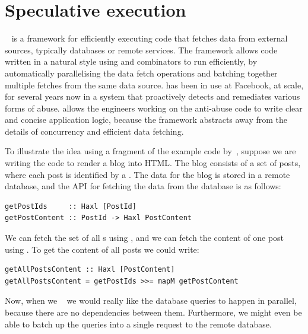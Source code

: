 \section{Speculative execution}\label{sec-haxl}

\Haxl~\citep{marlow2014haxl} is a framework for efficiently executing
code that fetches data from external sources, typically databases or
remote services. The \Haxl framework allows code written in a natural
style using  and  combinators to run
efficiently, by automatically parallelising the data fetch operations
and batching together multiple fetches from the same data source.
\Haxl has been in use at Facebook, at scale, for several years now in
a system that proactively detects and remediates various forms of
abuse. \Haxl allows the engineers working on the anti-abuse code to
write clear and concise application logic, because the framework
abstracts away from the details of concurrency and efficient data fetching.

To illustrate the idea using a fragment of the example code
by~\citet{marlow2014haxl}, suppose we are writing the code to render a blog
into HTML. The blog consists of a set of posts, where each post is identified by
a . The data for the blog is stored in a remote database, and the API
for fetching the data from the database is as follows:

\vspace{1mm}
\begin{verbatim}
getPostIds     :: Haxl [PostId]
getPostContent :: PostId -> Haxl PostContent
\end{verbatim}
\vspace{1mm}

\noindent
We can fetch the set of all s using , and we can fetch
the content of one post using . To get the content of all
posts we could write:

\vspace{0.5mm}
\begin{verbatim}
getAllPostsContent :: Haxl [PostContent]
getAllPostsContent = getPostIds >>= mapM getPostContent
\end{verbatim}
\vspace{0.5mm}

\noindent
Now, when we ~ we would really like the
database queries to happen in parallel, because there are no
dependencies between them. Furthermore, we might even be able to batch
up the queries into a single request to the remote database.

